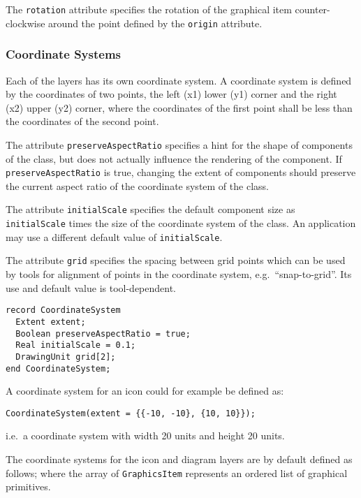 The \lstinline!rotation! attribute specifies the rotation of the graphical item
counter-clockwise around the point defined by the \lstinline!origin! attribute.

\subsubsection{Coordinate Systems}\label{coordinate-systems}

Each of the layers has its own coordinate system.
A coordinate system is defined by the coordinates of two points, the left (x1) lower (y1) corner and the right (x2) upper (y2) corner, where the coordinates of the first point shall be less than the coordinates of the second point.

The attribute \lstinline!preserveAspectRatio! specifies a hint for the shape of
components of the class, but does not actually influence the rendering of the component.
If \lstinline!preserveAspectRatio! is true, changing the
extent of components should preserve the current aspect ratio of the coordinate
system of the class.

The attribute \lstinline!initialScale! specifies the default component size as
\lstinline!initialScale! times the size of the coordinate system of the class. An
application may use a different default value of \lstinline!initialScale!.

The attribute \lstinline!grid! specifies the spacing between grid points which can
be used by tools for alignment of points in the coordinate system, e.g.\ ``snap-to-grid''.
Its use and default value is tool-dependent.

\begin{lstlisting}[language=modelica]
record CoordinateSystem
  Extent extent;
  Boolean preserveAspectRatio = true;
  Real initialScale = 0.1;
  DrawingUnit grid[2];
end CoordinateSystem;
\end{lstlisting}

\begin{example}
A coordinate system for an icon could for example be defined as:
\begin{lstlisting}[language=modelica]
CoordinateSystem(extent = {{-10, -10}, {10, 10}});
\end{lstlisting}
i.e.\ a coordinate system with width 20 units and height 20 units.
\end{example}

The coordinate systems for the icon and diagram layers are by default
defined as follows; where the array of \lstinline!GraphicsItem! represents an
ordered list of graphical primitives.

